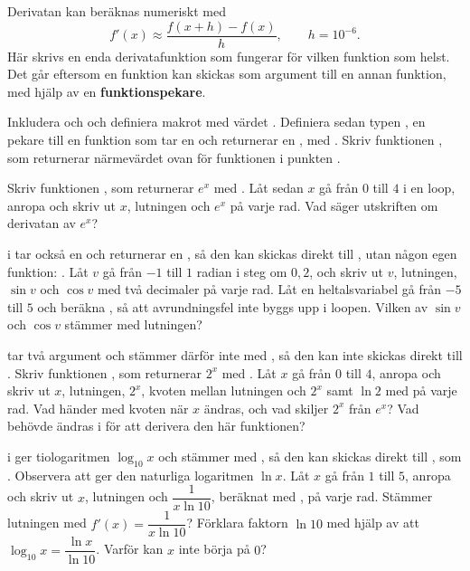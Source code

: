 Derivatan kan beräknas numeriskt med
\[
  f'(x) \approx \frac{f(x + h) - f(x)}{h}, \qquad h = 10^{-6}.
\]
Här skrivs en enda derivatafunktion som fungerar för vilken funktion som helst. Det går eftersom
en funktion kan skickas som argument till en annan funktion, med hjälp av en
\textbf{funktionspekare}.
\begin{parts}
  \item Inkludera  och  och definiera makrot  med
    värdet . Definiera sedan typen , en pekare till en funktion som
    tar en  och returnerar en , med
    . Skriv funktionen
    , som returnerar närmevärdet ovan för funktionen
     i punkten .
  \item Skriv funktionen , som returnerar $e^x$ med
    . Låt sedan $x$ gå från $0$ till $4$ i en loop, anropa
     och skriv ut $x$, lutningen och $e^x$ på varje rad. Vad säger
    utskriften om derivatan av $e^x$?
  \item {} i  tar också en  och returnerar en , så
    den kan skickas direkt till , utan någon egen funktion:
    . Låt $v$ gå från $-1$ till $1$ radian i steg om $0{,}2$, och skriv ut
    $v$, lutningen, $\sin v$ och $\cos v$ med två decimaler på varje rad. Låt en heltalsvariabel
     gå från $-5$ till $5$ och beräkna , så att avrundningsfel inte
    byggs upp i loopen. Vilken av $\sin v$ och $\cos v$ stämmer med lutningen?
  \item {} tar två argument och stämmer därför inte med , så den kan
    inte skickas direkt till . Skriv funktionen , som
    returnerar $2^x$ med . Låt $x$ gå från $0$ till $4$, anropa
     och skriv ut $x$, lutningen, $2^x$, kvoten mellan lutningen och $2^x$
    samt $\ln 2$ med  på varje rad. Vad händer med kvoten när $x$ ändras, och vad
    skiljer $2^x$ från $e^x$? Vad behövde ändras i  för att derivera den här
    funktionen?
  \item {} i  ger tiologaritmen $\log_{10} x$ och stämmer med
    , så den kan skickas direkt till , som . Observera
    att  ger den naturliga logaritmen $\ln x$. Låt $x$ gå från $1$ till $5$, anropa
     och skriv ut $x$, lutningen och $\dfrac{1}{x \ln 10}$, beräknat med
    , på varje rad. Stämmer lutningen med $f'(x) = \dfrac{1}{x \ln 10}$?
    Förklara faktorn $\ln 10$ med hjälp av att $\log_{10} x = \dfrac{\ln x}{\ln 10}$. Varför kan $x$
    inte börja på $0$?
\end{parts}
